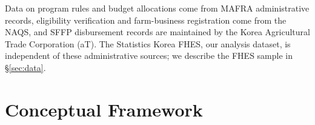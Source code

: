 \documentclass[12pt, a4paper]{article}
\begin{document}
Data on program rules and budget allocations come from MAFRA administrative records, eligibility verification and farm-business registration come from the NAQS, and SFFP disbursement records are maintained by the Korea Agricultural Trade Corporation (aT). The Statistics Korea FHES, our analysis dataset, is independent of these administrative sources; we describe the FHES sample in \S\ref{sec:data}.

\section{Conceptual Framework}
\label{sec:theory}

\end{document}
